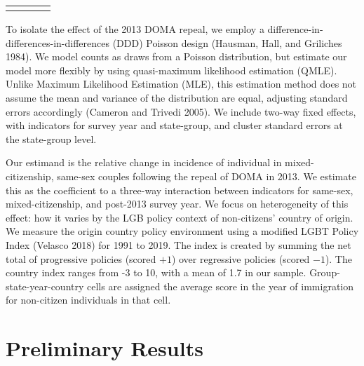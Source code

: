 \documentclass[
  12pt,
]{article}
\begin{document}
\begin{longtable}[c]{|p{0.77in}|p{1.29in}|p{1.10in}|p{1.05in}}
\noalign{\global\setlength{\arrayrulewidth}{2pt}}\arrayrulecolor[HTML]{666666}\cline{1-4}



\end{longtable}

To isolate the effect of the 2013 DOMA repeal, we employ a difference-in-differences-in-differences (DDD) Poisson design (Hausman, Hall, and Griliches 1984). We model counts as draws from a Poisson distribution, but estimate our model more flexibly by using quasi-maximum likelihood estimation (QMLE). Unlike Maximum Likelihood Estimation (MLE), this estimation method does not assume the mean and variance of the distribution are equal, adjusting standard errors accordingly (Cameron and Trivedi 2005). We include two-way fixed effects, with indicators for survey year and state-group, and cluster standard errors at the state-group level.

Our estimand is the relative change in incidence of individual in mixed-citizenship, same-sex couples following the repeal of DOMA in 2013. We estimate this as the coefficient to a three-way interaction between indicators for same-sex, mixed-citizenship, and post-2013 survey year. We focus on heterogeneity of this effect: how it varies by the LGB policy context of non-citizens' country of origin. We measure the origin country policy environment using a modified LGBT Policy Index (Velasco 2018) for 1991 to 2019. The index is created by summing the net total of progressive policies (scored \(+1\)) over regressive policies (scored \(-1\)). The country index ranges from -3 to 10, with a mean of 1.7 in our sample. Group-state-year-country cells are assigned the average score in the year of immigration for non-citizen individuals in that cell.

\hypertarget{preliminary-results}{%
\section{Preliminary Results}\label{preliminary-results}}

 
  \providecommand{\huxb}[2]{\arrayrulecolor[RGB]{#1}\global\arrayrulewidth=#2pt}
  \providecommand{\huxvb}[2]{\color[RGB]{#1}\vrule width #2pt}
  \providecommand{\huxtpad}[1]{\rule{0pt}{#1}}
  \providecommand{\huxbpad}[1]{\rule[-#1]{0pt}{#1}}
\end{document}
